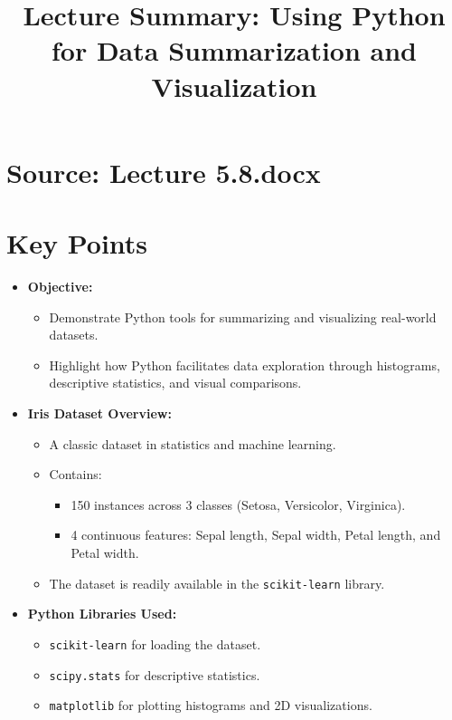 \documentclass{article}
\title{Lecture Summary: Using Python for Data Summarization and Visualization}
\author{}
\date{}
\begin{document}
\maketitle

\section*{Source: Lecture 5.8.docx}

\section*{Key Points}

\begin{itemize}
  \item \textbf{Objective:}
    \begin{itemize}
      \item Demonstrate Python tools for summarizing and visualizing real-world datasets.
      \item Highlight how Python facilitates data exploration through histograms, descriptive statistics, and visual comparisons.
    \end{itemize}

  \item \textbf{Iris Dataset Overview:}
    \begin{itemize}
      \item A classic dataset in statistics and machine learning.
      \item Contains:
        \begin{itemize}
          \item 150 instances across 3 classes (Setosa, Versicolor, Virginica).
          \item 4 continuous features: Sepal length, Sepal width, Petal length, and Petal width.
        \end{itemize}
      \item The dataset is readily available in the \texttt{scikit-learn} library.
    \end{itemize}

  \item \textbf{Python Libraries Used:}
    \begin{itemize}
      \item \texttt{scikit-learn} for loading the dataset.
      \item \texttt{scipy.stats} for descriptive statistics.
      \item \texttt{matplotlib} for plotting histograms and 2D visualizations.
    \end{itemize}


\end{itemize}
\end{document}
